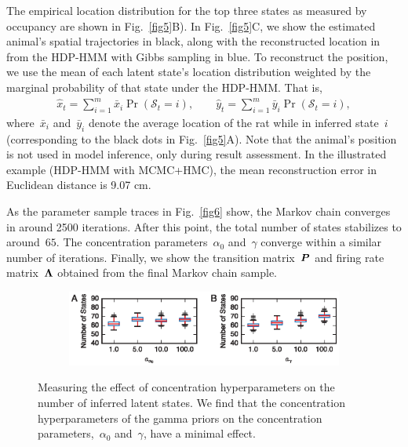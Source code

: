 The empirical location distribution for the top three states as
measured by occupancy are shown in Fig.~\ref{fig5}B). In
Fig.~\ref{fig5}C, we show the estimated animal's spatial trajectories
in black, along with the reconstructed location in from the HDP-HMM
with Gibbs sampling in blue. To reconstruct the position, we use the
mean of each latent state's location distribution weighted by the
marginal probability of that state under the HDP-HMM. That is,
\begin{align}
\hat{x}_t = \sum_{i=1}^m \bar{x}_i \Pr(\mathcal{S}_t=i), \qquad
\hat{y}_t = \sum_{i=1}^m  \bar{y}_i \Pr(\mathcal{S}_t=i),
\end{align}
where~$\bar{x}_i$ and~$\bar{y}_i$ denote the average location of the
rat while in inferred state~$i$ (corresponding to the black dots in
Fig.~\ref{fig5}A). Note that the animal's position is not used in
model inference, only during result assessment. In the illustrated
example (HDP-HMM with MCMC+HMC), the mean reconstruction error in
Euclidean distance is 9.07 cm.



As the parameter sample traces in Fig.~\ref{fig6} show, the Markov
chain converges in around 2500 iterations. After this point, the total
number of states stabilizes to around~$65$.  The concentration
parameters~$\alpha_0$ and~$\gamma$ converge within a similar number of
iterations.  Finally, we show the transition matrix~$\boldsymbol{P}$ and firing
rate matrix~$\boldsymbol{\Lambda}$ obtained from the final Markov chain sample.


\begin{figure}
  \centering
  \begin{subfigure}[t]{5in}
    \includegraphics[width=\textwidth]{figures/ch5/Fig7}
  \end{subfigure}
  \caption[Effect of concentration hyperparameters]{Measuring the
    effect of concentration hyperparameters on the number of inferred
    latent states. We find that the concentration hyperparameters of
    the gamma priors on the concentration parameters,~$\alpha_0$
    and~$\gamma$, have a minimal effect.}
  \label{fig7}
\end{figure}



